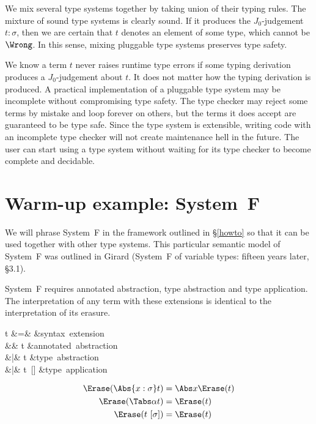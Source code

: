 \documentclass{amsart}
\begin{document}
We mix several type systems together by taking union of their
typing rules. The mixture of sound type systems is clearly sound.
If it produces the $J_0$-judgement $t:\sigma$, then we are
certain that $t$ denotes an element of some type, which cannot be
$\Wrong$. In this sense, mixing pluggable type systems preserves
type safety.

We know a term $t$ never raises runtime type errors if some
typing derivation produces a $J_0$-judgement about $t$. It does
not matter how the typing derivation is produced. A practical
implementation of a pluggable type system may be incomplete
without compromising type safety. The type checker may reject
some terms by mistake and loop forever on others, but the terms
it does accept are guaranteed to be type safe. Since the type
system is extensible, writing code with an incomplete type
checker will not create maintenance hell in the future. The user
can start using a type system without waiting for its type
checker to become complete and decidable.



\section{Warm-up example: System~F}

We will phrase System~F in the framework outlined in
\S\ref{howto} so that it can be used together with other type
systems. This particular semantic model of System~F was outlined
in Girard (System~F of variable types: fifteen years later,
\S3.1).


System~F requires annotated abstraction, type abstraction and
type application. The interpretation of any term with these
extensions is identical to the interpretation of its erasure.

\begin{syntax}
t &\+=& &\mbox{syntax extension} \\
&& t &\mbox{annotated abstraction}\\
&|& \Tabs\alpha t &\mbox{type abstraction}\\
&|& t~[\sigma] &\mbox{type application}
\end{syntax}%

\begin{align*}
\Erase(\Abs{x:\sigma}t) & = \Abs x\Erase(t) \\
\Erase(\Tabs\alpha t) &= \Erase(t) \\
\Erase(t~[\sigma]) &= \Erase(t)
\end{align*}
\end{document}
